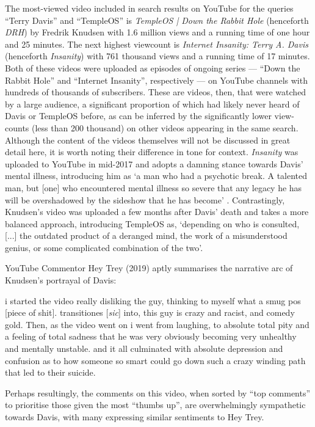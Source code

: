 \documentclass[Draft.tex]{subfiles}
\begin{document}
The most-viewed video included in search results on YouTube
for the queries ``Terry Davis'' and ``TempleOS'' is
\textit{TempleOS | Down the Rabbit Hole} (henceforth \textit{DRH})
by Fredrik Knudsen with 1.6 million views
and a running time of one hour and 25 minutes.
The next highest viewcount is \textit{Internet Insanity: Terry A. Davis}
(henceforth \textit{Insanity}) with 761 thousand views and a running time of 17 minutes.
Both of these videos were uploaded as episodes of ongoing series
--- ``Down the Rabbit Hole'' and ``Internet Insanity'', respectively ---
on YouTube channels with hundreds of thousands of subscribers.
These are videos, then, that were watched by a large audience,
a significant proportion of which had likely never heard of Davis
or TempleOS before, as can be inferred
by the significantly lower view-counts (less than 200 thousand)
on other videos appearing in the same search.
Although the content of the videos themselves
will not be discussed in great detail here,
it is worth noting their difference in tone for context.
\textit{Insanity} was uploaded to YouTube in mid-2017 and adopts a damning stance
towards Davis' mental illness, introducing him as
`a man who had a psychotic break.
A talented man, but [one] who encountered mental illness so severe
that any legacy he has will be overshadowed
by the sideshow that he has become' \parencite*{Metokur17}.
Contrastingly, Knudsen's \parencite*{Knudsen18} video
was uploaded a few months after Davis' death and
takes a more balanced approach, introducing TempleOS as,
`depending on who is consulted, [...] the outdated product of a deranged mind,
the work of a misunderstood genius, or some complicated combination of the two'.

YouTube Commentor Hey Trey (2019) aptly summarises
the narrative arc of Knudsen's portrayal of Davis:
\begin{displayquote}
	i started the video really disliking the guy,
	thinking to myself what a smug pos [piece of shit].
	transitiones [\textit{sic}] into, this guy is crazy and racist, and comedy gold.
	Then, as the video went on i went from laughing, to absolute total pity
	and a feeling of total sadness that he was very obviously
	becoming very unhealthy and mentally unstable.
	and it all culminated with absolute depression and confusion as to
	how someone so smart could go down such a crazy winding path
	that led to their suicide.\footnotemark
\end{displayquote}
Perhaps resultingly, the comments on this video, when sorted by ``top comments''
to prioritise those given the most ``thumbs up'',
are overwhelmingly sympathetic towards Davis, with many expressing similar
sentiments to Hey Trey.
\end{document}
